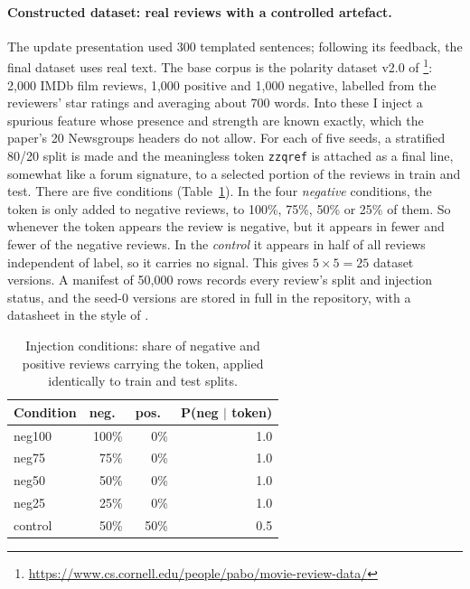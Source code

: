 \documentclass[11pt]{article}
\newcommand{\tok}[1]{\texttt{#1}}
\begin{document}
\paragraph{Constructed dataset: real reviews with a controlled artefact.} The update presentation used 300 templated sentences; following its feedback, the final dataset uses real text. The base corpus is the polarity dataset v2.0 of \citet{pang2004sentimental}\footnote{\url{https://www.cs.cornell.edu/people/pabo/movie-review-data/}}: 2,000 IMDb film reviews, 1,000 positive and 1,000 negative, labelled from the reviewers' star ratings and averaging about 700 words. Into these I inject a spurious feature whose presence and strength are known exactly, which the paper's 20 Newsgroups headers do not allow. For each of five seeds, a stratified 80/20 split is made and the meaningless token \tok{zzqref} is attached as a final line, somewhat like a forum signature, to a selected portion of the reviews in train and test. There are five conditions (Table~\ref{tab:conditions}). In the four \emph{negative} conditions, the token is only added to negative reviews, to 100\%, 75\%, 50\% or 25\% of them. So whenever the token appears the review is negative, but it appears in fewer and fewer of the negative reviews. In the \emph{control} it appears in half of all reviews independent of label, so it carries no signal. This gives $5\times5 = 25$ dataset versions. A manifest of 50,000 rows records every review's split and injection status, and the seed-0 versions are stored in full in the repository, with a datasheet in the style of \citet{gebru2021datasheets}.

\begin{table}[t]
\centering\small
\begin{tabular}{@{}lrrr@{}}
\toprule
Condition & neg.\ & pos.\ & P(neg $\mid$ token) \\
\midrule
neg100 & 100\% & 0\% & 1.0 \\
neg75 & 75\% & 0\% & 1.0 \\
neg50 & 50\% & 0\% & 1.0 \\
neg25 & 25\% & 0\% & 1.0 \\
control & 50\% & 50\% & 0.5 \\
\bottomrule
\end{tabular}
\caption{Injection conditions: share of negative and positive reviews carrying the token, applied identically to train and test splits.}
\label{tab:conditions}
\end{table}
\end{document}
